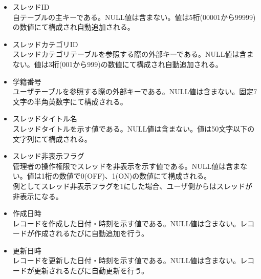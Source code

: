 \documentclass[a4j]{jarticle}
\begin{document}
  \begin{itemize}  
  \item スレッドID\\
    自テーブルの主キーである。NULL値は含まない。値は5桁(00001から99999)の数値にて構成され自動追加される。\\

  \item スレッドカテゴリID\\
    スレッドカテゴリテーブルを参照する際の外部キーである。NULL値は含まない。値は3桁(001から999)の数値にて構成され自動追加される。\\
    
  \item 学籍番号\\
    ユーザテーブルを参照する際の外部キーである。NULL値は含まない。固定7文字の半角英数字にて構成される。\\
    
  \item スレッドタイトル名\\
    スレッドタイトルを示す値である。NULL値は含まない。値は50文字以下の文字列にて構成される。\\
  \item スレッド非表示フラグ\\
    管理者の操作権限でスレッドを非表示を示す値である。NULL値は含まない。値は1桁の数値で0(OFF)、1(ON)の数値にて構成される。\\
    例としてスレッド非表示フラグを1にした場合、ユーザ側からはスレッドが非表示になる。
  \item 作成日時\\
    レコードを作成した日付・時刻を示す値である。NULL値は含まない。レコードが作成されるたびに自動追加を行う。
  \item 更新日時\\
    レコードを更新した日付・時刻を示す値である。NULL値は含まない。レコードが更新されるたびに自動更新を行う。
  \end{itemize}
\end{document}
